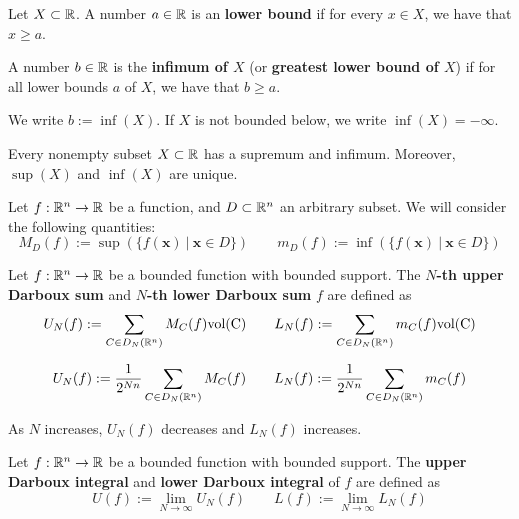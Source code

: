 \begin{definition}
    Let $X \subset \mathbb{R}$.  A number $a \in \mathbb{R}$ is an \textbf{lower bound} if for every $x \in X$, we have that $x \geq a$.  
    
    A number $b \in \mathbb{R}$ is the \textbf{infimum of $X$} (or \textbf{greatest lower bound of $X$}) if for all lower bounds $a$ of $X$, we have that $b \geq a$.
    
    We write $b := \inf(X)$.  If $X$ is not bounded below, we write $\inf(X) = -\infty$.
    
    \end{definition}

    \begin{theorem}[Completeness of $\R$]
    Every nonempty subset $X \subset \mathbb{R}$ has a supremum and infimum. Moreover, $\sup(X)$ and $\inf(X)$ are unique.
    \end{theorem}

    \begin{definition}
    Let $f: \mathbb{R}^n \to \mathbb{R}$ be a function, and $D \subset \mathbb{R}^n$ an arbitrary subset. We will consider the following quantities:
    $$M_D(f) := \sup(\{f(\bm{x}) \ | \ \bm{x} \in D\}) \qquad m_D(f) := \inf(\{f(\bm{x}) \ | \ \bm{x} \in D\})$$
    
    \end{definition}
    
    \begin{definition}
    Let $f: \mathbb{R}^n \to \mathbb{R}$ be a bounded function with bounded support. The $N$\textbf{-th upper Darboux sum} and $N$\textbf{-th lower Darboux sum} $f$ are defined as 
    $$U_N(f) := \sum_{C \in D_N(\mathbb{R}^n)} M_C(f)\textnormal{vol(C)} \qquad L_N(f) := \sum_{C \in D_N(\mathbb{R}^n)} m_C(f)\textnormal{vol(C)}$$
    
    \end{definition}

    \begin{proposition}
    $$U_N(f) := \frac{1}{2^{Nn}} \sum_{C \in D_N(\mathbb{R}^n)} M_C(f)  \qquad L_N(f) := \frac{1}{2^{Nn}}\sum_{C \in D_N(\mathbb{R}^n)} m_C(f)$$
    \end{proposition}
    
    \begin{proposition}
    As $N$ increases, $U_N(f)$ decreases and $L_N(f)$ increases.
    \end{proposition}

    
    \begin{definition}
    Let $f: \mathbb{R}^n \to \mathbb{R}$ be a bounded function with bounded support.  The \textbf{upper Darboux integral} and \textbf{lower Darboux integral} of $f$ are defined as
    $$U(f) := \lim_{N \to \infty} U_N(f)   \qquad L(f) := \lim_{N \to \infty} L_N(f)$$
    \end{definition}

